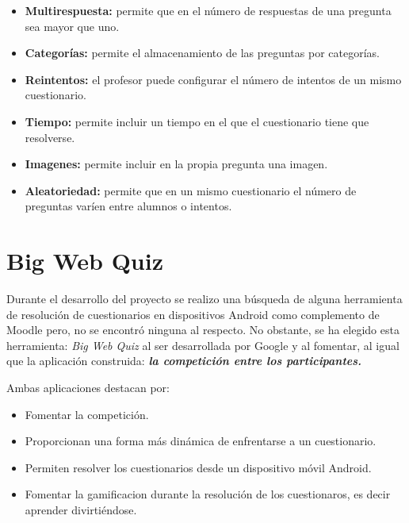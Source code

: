 \begin{itemize}
	\item \textbf{Multirespuesta:} permite que en el número de respuestas de una pregunta sea mayor que uno.
	
	\item \textbf{Categorías:} permite el almacenamiento de las preguntas por categorías.
	
	\item \textbf{Reintentos:} el profesor puede configurar el número de intentos de un mismo cuestionario.
	
	\item \textbf{Tiempo:} permite incluir un tiempo en el que el cuestionario tiene que resolverse.
	
	\item \textbf{Imagenes:} permite incluir en la propia pregunta una imagen.
	
	\item \textbf{Aleatoriedad:} permite que en un mismo cuestionario el número de preguntas varíen entre alumnos o intentos.
	
\end{itemize}


\section{Big Web Quiz}\cite{wiki:bigwebquiz}

Durante el desarrollo del proyecto se realizo una búsqueda de alguna herramienta de resolución de cuestionarios en dispositivos Android como complemento de Moodle pero, no se encontró ninguna al respecto. No obstante, se ha elegido esta herramienta: \emph{Big Web Quiz} al ser desarrollada por Google y al fomentar, al igual que la aplicación construida: \emph{\textbf{la competición entre los participantes.}}


Ambas aplicaciones destacan por:
\begin{itemize}
	\item Fomentar la competición.
	\item Proporcionan una forma más dinámica de enfrentarse a un cuestionario.
	\item Permiten resolver los cuestionarios desde un dispositivo móvil Android.
	\item Fomentar la gamificacion durante la resolución de los cuestionaros, es decir aprender divirtiéndose.
\end{itemize}
	

